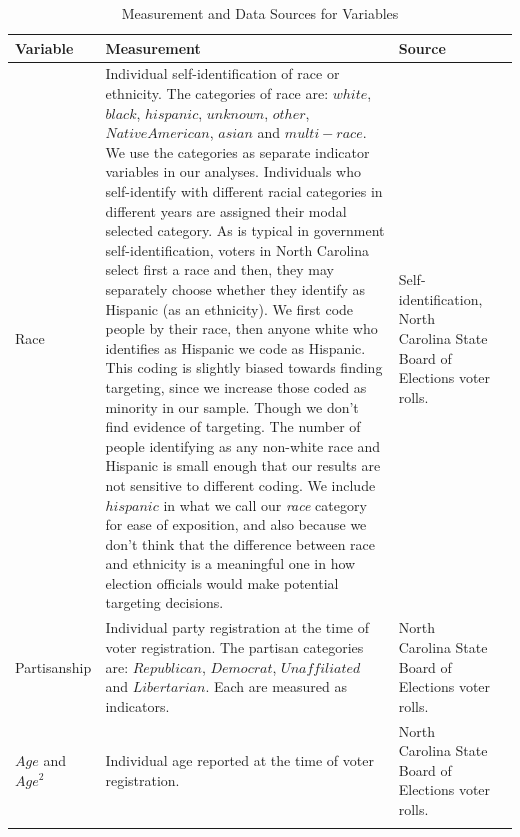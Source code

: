 \documentclass[12pt]{article}
\begin{document}

\begin{table}[h!]\centering \footnotesize
\def\sym#1{\ifmmode^{#1}\else\(^{#1}\)\fi}
	\caption{\small Measurement and Data Sources for Variables}\label{table_covariates}
	\smallskip
	\begin{tabular}{@{\extracolsep{5pt}}l*{3}{l}}
	\noalign{\smallskip}\hline\hline\noalign{\smallskip}\noalign{\smallskip}
	Variable & Measurement & Source   \\
	\midrule
	Race & \multicolumn{1}{p{2.9in}}{Individual self-identification of race or ethnicity.  The categories of race are: $white$, $black$, $hispanic$, $unknown$, $other$, $Native American$, $asian$ and $multi-race$.  We use the categories as separate indicator variables in our analyses. Individuals who self-identify with different racial categories in different years are assigned their modal selected category.  As is typical in government self-identification, voters in North Carolina select first a race and then,  they may separately choose whether they identify as Hispanic (as an ethnicity).  We first code people by their race, then anyone white who identifies as Hispanic we code as Hispanic.  This coding is slightly biased towards finding targeting, since we increase those coded as minority in our sample.  Though we don't find evidence of targeting.  The number of people identifying as any non-white race and Hispanic is small enough that our results are not sensitive to different coding. We include $hispanic$ in what we call our \emph{race} category for ease of exposition, and also because we don't think that the difference between race and ethnicity is a meaningful one in how election officials would make potential targeting decisions.  } & \multicolumn{1}{p{2.0in}}{Self-identification, North Carolina State Board of Elections voter rolls.} \\
	\noalign{\smallskip}\noalign{\smallskip}
	Partisanship & \multicolumn{1}{p{2.9in}}{Individual party registration at the time of voter registration.  The partisan categories are: $Republican$, $Democrat$, $Unaffiliated$ and $Libertarian$.  Each are measured as indicators.} & \multicolumn{1}{p{2.0in}}{North Carolina State Board of Elections voter rolls.} \\
	\noalign{\smallskip}\noalign{\smallskip}
	$Age$ and $Age^{2}$ & \multicolumn{1}{p{2.9in}}{Individual age reported at the time of voter registration.} & \multicolumn{1}{p{2.0in}}{North Carolina State Board of Elections voter rolls.} \\
	\noalign{\smallskip}
	\hline\hline\noalign{\smallskip}
\end{tabular}
\end{table}
\end{document}
